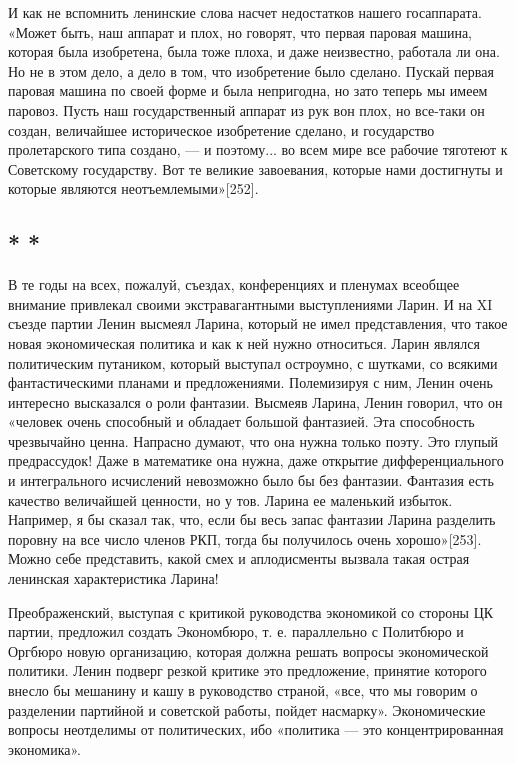 \documentclass[12pt, a4paper, openany]{book}
\begin{document}
И как не вспомнить ленинские слова насчет недостатков нашего госаппарата. «Может быть, наш аппарат и плох, но говорят, что первая паровая машина, которая была изобретена, была тоже плоха, и даже неизвестно, работала ли она. Но не в этом дело, а дело в том, что изобретение было сделано. Пускай первая паровая машина по своей форме и была непригодна, но зато теперь мы имеем паровоз. Пусть наш государственный аппарат из рук вон плох, но все-таки он создан, величайшее историческое изобретение сделано, и государство пролетарского типа создано, — и поэтому... во всем мире все рабочие тяготеют к Советскому государству. Вот те великие завоевания, которые нами достигнуты и которые являются неотъемлемыми»[252].

\subsection*{\center * * *}

В те годы на всех, пожалуй, съездах, конференциях и пленумах всеобщее внимание привлекал своими экстравагантными выступлениями Ларин. И на XI съезде партии Ленин высмеял Ларина, который не имел представления, что такое новая экономическая политика и как к ней нужно относиться. Ларин являлся политическим путаником, который выступал остроумно, с шутками, со всякими фантастическими планами и предложениями. Полемизируя с ним, Ленин очень интересно высказался о роли фантазии. Высмеяв Ларина, Ленин говорил, что он «человек очень способный и обладает большой фантазией. Эта способность чрезвычайно ценна. Напрасно думают, что она нужна только поэту. Это глупый предрассудок! Даже в математике она нужна, даже открытие дифференциального и интегрального исчислений невозможно было бы без фантазии. Фантазия есть качество величайшей ценности, но у тов. Ларина ее маленький избыток. Например, я бы сказал так, что, если бы весь запас фантазии Ларина разделить поровну на все число членов РКП, тогда бы получилось очень хорошо»[253]. Можно себе представить, какой смех и аплодисменты вызвала такая острая ленинская характеристика Ларина!

Преображенский, выступая с критикой руководства экономикой со стороны ЦК партии, предложил создать Экономбюро, т. е. параллельно с Политбюро и Оргбюро новую организацию, которая должна решать вопросы экономической политики. Ленин подверг резкой критике это предложение, принятие которого внесло бы мешанину и кашу в руководство страной, «все, что мы говорим о разделении партийной и советской работы, пойдет насмарку». Экономические вопросы неотделимы от политических, ибо «политика — это концентрированная экономика».
\end{document}
